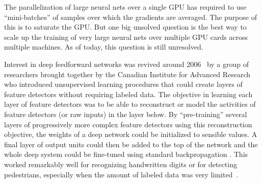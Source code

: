 \documentclass[10pts]{article}
\begin{document}

The parallelization of large neural nets over a single GPU has
required to use ``mini-batches'' of samples over which the gradients
are averaged. The purpose of this is to saturate the GPU. But one big
unsolved question is the best way to scale up the training of very large neural
nets over multiple GPU cards across multiple machines. As of today, this
question is still unresolved.

Interest in deep feedforward networks was revived around
2006~\citep{IJCAI,Hinton06-small,Bengio-nips-2006-small,ranzato-07-small}
by a group of researchers brought together by the Canadian Institute
for Advanced Research who introduced
unsupervised learning procedures that could
create layers of feature detectors without requiring labeled data. The
objective in learning each layer of feature detectors was to be able
to reconstruct or model the activities of feature detectors (or raw
inputs) in the layer below.  By ``pre-training'' several layers of
progressively more complex feature detectors using this reconstruction
objective, the weights of a deep network could be initialized to
sensible values.  A final layer of output units could then be added to
the top of the network and the whole deep system could be fine-tuned
using standard backpropagation
\citep{Hinton-Science2006,Bengio-nips-2006-small,ranzato-07-small}.
This worked remarkably well for recognizing handwritten digits or for
detecting pedestrians, especially when the amount of labeled data was
very limited~\citep{sermanet-cvpr-13}.
\end{document}
